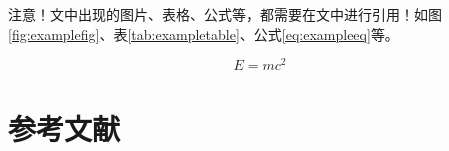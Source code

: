 \documentclass{CUCMidterm}
\begin{document}
{    注意！文中出现的图片、表格、公式等，都需要在文中进行引用！如图\ref{fig:examplefig}、表\ref{tab:exampletable}、公式\ref{eq:exampleeq}等。
  
    \begin{equation}
      E = mc^2 
      \label{eq:exampleeq}
    \end{equation}
  
    \section{参考文献}
    \printbibliography[heading=none]

}
{

}
{

}
\end{document}
